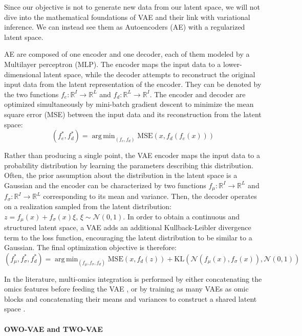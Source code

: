 \documentclass{article}
\DeclareMathOperator*{\argmin}{arg\,min}
\begin{document}
Since our objective is not to generate new data from our latent space, we will not dive into the mathematical foundations of VAE and their link with variational inference.
We can instead see them as Autoencoders (AE) with a regularized latent space.

AE are composed of one encoder and one decoder, each of them modeled by a Multilayer perceptron (MLP).
The encoder maps the input data to a lower-dimensional latent space, while the decoder attempts to reconstruct the original input data from the latent representation of the encoder.
They can be denoted by the two functions $f_e: \mathbb{R}^I \longrightarrow \mathbb{R}^L$ and $f_d: \mathbb{R}^L \longrightarrow \mathbb{R}^I$.
The encoder and decoder are optimized simultaneously by mini-batch gradient descent to minimize the mean square error (MSE) between the input data and its reconstruction from the latent space: $$(f_e^*, f_d^*) = \argmin_{(f_e, f_d)} \text{MSE}(x, f_d(f_e(x)))$$

Rather than producing a single point, the VAE encoder maps the input data to a probability distribution by learning the parameters describing this distribution.
Often, the prior assumption about the distribution in the latent space is a Gaussian and the encoder can be characterized by two functions $f_\mu: \mathbb{R}^I \longrightarrow \mathbb{R}^L$ and $f_\sigma: \mathbb{R}^I \longrightarrow \mathbb{R}^L$ corresponding to its mean and variance.
Then, the decoder operates on a realization sampled from the latent distribution: $z = f_\mu(x) + f_\sigma(x) \xi \text{, } \xi \sim \mathcal{N}(0, 1)$.
In order to obtain a continuous and structured latent space, a VAE adds an additional Kullback-Leibler divergence term to the loss function, encouraging the latent distribution to be similar to a Gaussian.
The final optimization objective is therefore: 
$$(f_\mu^*, f_\sigma^*, f_d^*) = \argmin_{(f_\mu, f_\sigma, f_d)} \text{MSE}(x, f_d(z)) + \text{KL}(\mathcal{N}(f_\mu(x), f_\sigma(x)), \mathcal{N}(0, 1))$$

In the literature, multi-omics integration is performed by either concatenating the omics features before feeding the VAE \cite{OmiVAE}, or by training as many VAEs as omic blocks and concatenating their means and variances to construct a shared latent space \cite{leng_2022_benchmark}.

\paragraph{OWO-VAE and TWO-VAE}\label{paragraph:owo-two-vae}
\end{document}
